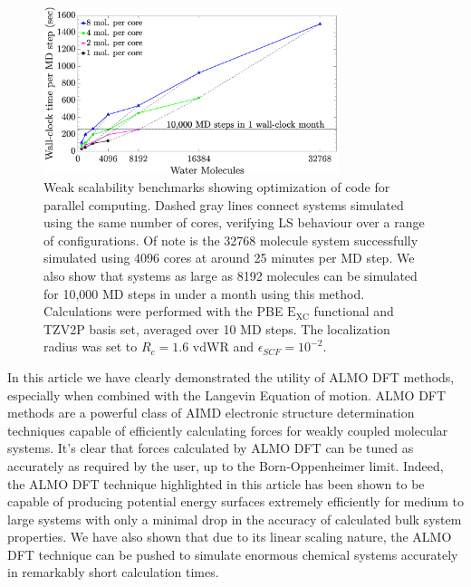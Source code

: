 \documentclass[aps,prl,reprint,amsmath,amssymb]{revtex4-1}
\begin{document}
\begin{figure}
\includegraphics[trim={1.6cm 0cm 4.7cm 0cm},clip,width=8.6cm]{weakscaling.eps}
\caption{\label{fig:weakscaling} Weak scalability benchmarks showing optimization of code for parallel computing.
Dashed gray lines connect systems simulated using the same number of cores, verifying LS behaviour over a range of configurations.
Of note is the 32768 molecule system successfully simulated using 4096 cores at around 25 minutes per MD step.
We also show that systems as large as 8192 molecules can be simulated for 10,000 MD steps in under a month using this method.
Calculations were performed with the PBE $\mathrm{E_{XC}}$ functional and TZV2P basis set, averaged over 10 MD steps. 
The localization radius was set to $R_{c} = 1.6$ vdWR and $\epsilon_{SCF} = 10^{-2}$.}
\end{figure}


In this article we have clearly demonstrated the utility of ALMO DFT methods, especially when combined with the Langevin Equation of motion.
ALMO DFT methods are a powerful class of AIMD electronic structure determination techniques capable of efficiently calculating forces for weakly coupled molecular systems.
It's clear that forces calculated by ALMO DFT can be tuned as accurately as required by the user, up to the Born-Oppenheimer limit.
Indeed, the ALMO DFT technique highlighted in this article has been shown to be capable of producing potential energy surfaces extremely efficiently for medium to large systems with only a minimal drop in the accuracy of calculated bulk system properties.
We have also shown that due to its linear scaling nature, the ALMO DFT technique can be pushed to simulate enormous chemical systems accurately in remarkably short calculation times.
\end{document}

